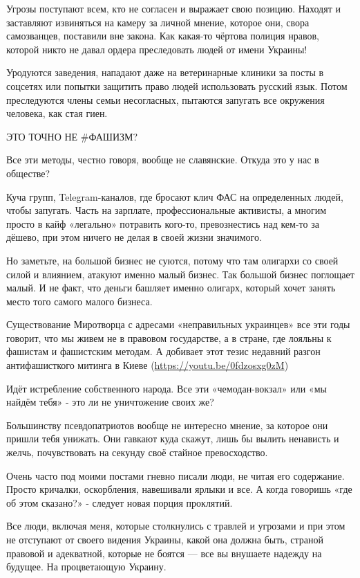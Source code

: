 Угрозы поступают всем, кто не согласен и выражает свою позицию. Находят и
заставляют извиняться на камеру за личной мнение, которое они, свора
самозванцев, поставили вне закона. Как какая-то чёртова полиция нравов, которой
никто не давал ордера преследовать людей от имени Украины!

Уродуются заведения, нападают даже на ветеринарные клиники за посты в соцсетях
или попытки защитить право людей использовать русский язык. Потом преследуются
члены семьи несогласных, пытаются запугать все окружения человека, как стая
гиен. 

ЭТО ТОЧНО НЕ \#ФАШИЗМ?

Все эти методы, честно говоря, вообще не славянские. Откуда это у нас в
обществе? 

Куча групп, Telegram-каналов, где бросают клич ФАС на определенных людей, чтобы
запугать. Часть на зарплате, профессиональные активисты, а многим просто в кайф
«легально» потравить кого-то, превознестись над кем-то за дёшево, при этом
ничего не делая в своей жизни значимого. 

Но заметьте, на большой бизнес не суются, потому что там олигархи со своей
силой и влиянием, атакуют именно малый бизнес. Так большой бизнес поглощает
малый. И не факт, что деньги башляет именно олигарх, который хочет занять место
того самого малого бизнеса.

Существование Миротворца с адресами «неправильных украинцев» все эти годы
говорит, что мы живем не в правовом государстве, а в стране, где лояльны к
фашистам и фашистским методам. А добивает этот тезис недавний разгон
антифашисткого митинга в Киеве (\url{https://youtu.be/0fdzosxg0zM})

Идёт истребление собственного народа. Все эти «чемодан-вокзал» или «мы найдём
тебя» - это ли не уничтожение своих же? 

Большинству псевдопатриотов вообще не интересно мнение, за которое они пришли
тебя унижать. Они гавкают куда скажут, лишь бы вылить ненависть и желчь,
почувствовать на секунду своё стайное превосходство. 

Очень часто под моими постами гневно писали люди, не читая его содержание.
Просто кричалки, оскорбления, навешивали ярлыки и все. А когда говоришь «где об
этом сказано?» - следует новая порция проклятий.

Все люди, включая меня, которые столкнулись с травлей и угрозами и при этом не
отступают от своего видения Украины, какой она должна быть, страной правовой и
адекватной, которые не боятся — все вы внушаете надежду на будущее. На
процветающую Украину.

